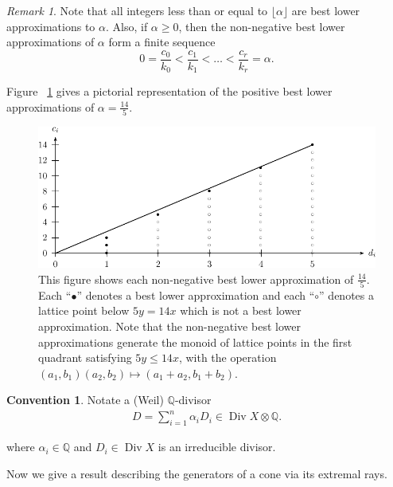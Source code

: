 \documentclass{amsart}
\theoremstyle{plain}
\theoremstyle{definition}
\newtheorem{convention}[thm]{Convention}
\theoremstyle{remark}
\newtheorem{rem}[thm]{Remark}
\numberwithin{equation}{section}
\newcommand\bq{{\mathbb Q}}
\DeclareMathOperator\di{Div}
\begin{document}
\begin{rem}
\label{rem:lower-approximation}
Note that all integers less than or equal to $\lfloor \alpha \rfloor$
are best lower approximations to $\alpha$. Also, if $\alpha \ge 0$,
then the non-negative best lower approximations of
$\alpha$ form a finite sequence
\[
	0 = \frac{c_0}{k_0} < \frac{c_1}{k_1} < \ldots < \frac{c_r}{k_r} = \alpha.
\]

\noindent
Figure ~\ref{fig:s14/5-lattice} gives a pictorial representation of the positive best lower approximations of $\alpha = \frac{14}{5}$.
\end{rem}

\begin{figure}
\includegraphics{pics/spin-lower-approximations-pic-pics.pdf}
\caption{This figure shows each non-negative best lower
approximation of $\frac{14}{5}.$ Each ``$\bullet$'' denotes a best
lower approximation and each ``$\circ$'' denotes a lattice point
below $5y=14x$ which is not a best lower approximation.  Note that
the non-negative best lower approximations generate the monoid of
lattice points in the first quadrant satisfying  $5y \le 14x$, with
the operation $(a_1, b_1)(a_2, b_2)\mapsto (a_1 + a_2, b_1 + b_2)$.}
\label{fig:s14/5-lattice}
\end{figure}

\begin{convention}
Notate a (Weil) $\bq$-divisor
\begin{align*}
	D = \sum_{i=1}^{n}\alpha_i D_i \in \di X \otimes \bq.
\end{align*}

\noindent
where $\alpha_i \in \bq$ and $D_i \in \di X$ is an irreducible divisor.
\end{convention}

Now we give a result describing the generators of a cone via its
extremal rays.
\end{document}
